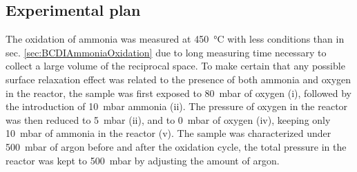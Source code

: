 \subsection{Experimental plan}\label{sec:SXRDPlan}

The oxidation of ammonia was measured at \qty{450}{\degreeCelsius} with less conditions than in sec. \ref{sec:BCDIAmmoniaOxidation} due to long measuring time necessary to collect a large volume of the reciprocal space.
To make certain that any possible surface relaxation effect was related to the presence of both ammonia and oxygen in the reactor, the sample was first exposed to \qty{80}{\milli\bar} of oxygen (i), followed by the introduction of \qty{10}{\milli\bar} ammonia (ii).
The pressure of oxygen in the reactor was then reduced to \qty{5}{\milli\bar} (ii), and to \qty{0}{\milli\bar} of oxygen (iv), keeping only \qty{10}{\milli\bar} of ammonia in the reactor (v).
The sample was characterized under \qty{500}{\milli\bar} of argon before and after the oxidation cycle, the total pressure in the reactor was kept to \qty{500}{\milli\bar} by adjusting the amount of argon.